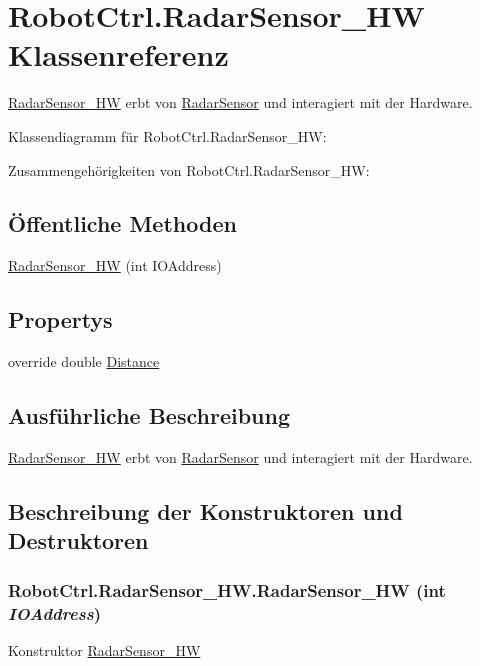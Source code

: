 \hypertarget{class_robot_ctrl_1_1_radar_sensor___h_w}{
\section{RobotCtrl.RadarSensor\_\-HW Klassenreferenz}
\label{class_robot_ctrl_1_1_radar_sensor___h_w}
}


\hyperlink{class_robot_ctrl_1_1_radar_sensor___h_w}{RadarSensor\_\-HW} erbt von \hyperlink{class_robot_ctrl_1_1_radar_sensor}{RadarSensor} und interagiert mit der Hardware.  




Klassendiagramm für RobotCtrl.RadarSensor\_\-HW:

Zusammengehörigkeiten von RobotCtrl.RadarSensor\_\-HW:\subsection*{Öffentliche Methoden}
\begin{DoxyCompactItemize}
\item 
\hyperlink{class_robot_ctrl_1_1_radar_sensor___h_w_a7730198b6097b06b30539165d3ca4953}{RadarSensor\_\-HW} (int IOAddress)
\end{DoxyCompactItemize}
\subsection*{Propertys}
\begin{DoxyCompactItemize}
\item 
override double \hyperlink{class_robot_ctrl_1_1_radar_sensor___h_w_a0eb1060a6e45bb29fdbf99e35481311e}{Distance}
\end{DoxyCompactItemize}


\subsection{Ausführliche Beschreibung}
\hyperlink{class_robot_ctrl_1_1_radar_sensor___h_w}{RadarSensor\_\-HW} erbt von \hyperlink{class_robot_ctrl_1_1_radar_sensor}{RadarSensor} und interagiert mit der Hardware. 

\subsection{Beschreibung der Konstruktoren und Destruktoren}
\hypertarget{class_robot_ctrl_1_1_radar_sensor___h_w_a7730198b6097b06b30539165d3ca4953}{
\subsubsection[{RadarSensor\_\-HW}]{\setlength{\rightskip}{0pt plus 5cm}RobotCtrl.RadarSensor\_\-HW.RadarSensor\_\-HW (int {\em IOAddress})}}
\label{class_robot_ctrl_1_1_radar_sensor___h_w_a7730198b6097b06b30539165d3ca4953}
Konstruktor \hyperlink{class_robot_ctrl_1_1_radar_sensor___h_w}{RadarSensor\_\-HW}


